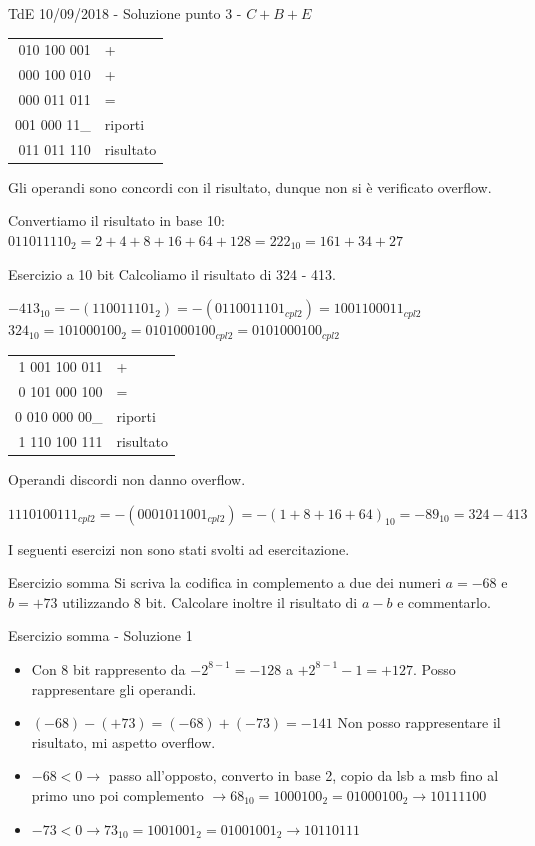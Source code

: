\documentclass[aspectratio=169]{beamer}
\begin{document}
\begin{frame}{TdE 10/09/2018 - Soluzione punto 3 - $C+B+E$}
\begin{tabular}{r|l}
	010 100 001 & + \\
	000 100 010 & + \\
	000 011 011 &	=	\\
	\hline
	001 000 11\_&	riporti\\
	011 011 110	& risultato
\end{tabular}

\pause
Gli operandi sono concordi con il risultato, dunque non si è verificato overflow.

\pause
Convertiamo il risultato in base 10: $011011110_2 = 2+4+8+16+64+128 = 222_{10} = 161+34+27$
\end{frame}

\begin{frame}{Esercizio a 10 bit}
Calcoliamo il risultato di 324 - 413.

\pause
$-413_{10} = -(110011101_2) = -(0110011101_{cpl2}) = 1001100011_{cpl2}$\\
$324_{10} = 101000100_2 = 0101000100_{cpl2}        = 0101000100_{cpl2}$

\pause
\begin{tabular}{r|l}
	1 001 100 011 & + \\
	0 101 000 100 & = \\
	\hline
	0 010 000 00\_&	riporti\\
    1 110 100 111 & risultato
\end{tabular}

\pause
Operandi discordi non danno overflow.

\pause
$1110100111_{cpl2} = -(0001011001_{cpl2}) = -(1+8+16+64)_{10} = -89_{10} = 324-413$
\end{frame}

\begin{frame}
I seguenti esercizi non sono stati svolti ad esercitazione.
\end{frame}


\begin{frame}{Esercizio somma}
Si scriva la codifica in complemento a due dei numeri $a=-68$ e $b=+73$ utilizzando 8 bit.
Calcolare inoltre il risultato di $a-b$ e commentarlo.
\end{frame}

\begin{frame}{Esercizio somma - Soluzione 1}
\begin{itemize}[<+->]
\item Con 8 bit rappresento da $-2^{8-1} = -128$ a $+2^{8-1}-1 = +127$. Posso rappresentare gli operandi.
\item $(-68) - (+73) = (-68) + (-73) = -141$ Non posso rappresentare il risultato, mi aspetto overflow.
\item $-68 < 0 \rightarrow$ passo all'opposto, converto in base 2, copio da lsb a msb fino al primo uno poi complemento $\rightarrow 68_{10} = 1000100_2 = 01000100_2 \rightarrow 10111100$
\item $-73 < 0 \rightarrow 73_{10} = 1001001_2 = 01001001_2 \rightarrow 10110111$
\end{itemize}
\end{frame}
\end{document}
